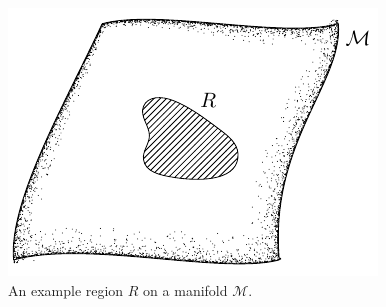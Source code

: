 \begin{figure}[htp]
	\centering
	\includegraphics{scripts/create_example_region_manifold.pdf}
	\caption{
		An example region \(R\) on a manifold \(\mathcal{M}\).
	}\label{fig:region}
\end{figure}
